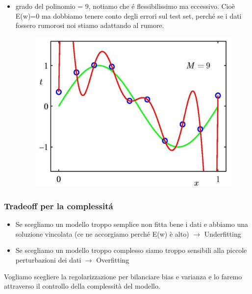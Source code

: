 \documentclass{article}
\begin{document}
\begin{itemize}
    \item grado del polinomio = 9, notiamo che é flessibilissimo ma eccessivo. Cioè E(w)=0 ma dobbiamo tenere conto degli errori sul test set, perché se i dati fossero rumorosi noi stiamo adattando al rumore.
    \begin{figure}[H]
    \centering
    \includegraphics[scale=0.3]{Images/9gradepol.png}
    \end{figure}
\end{itemize}

\subsubsection{Tradeoff per la complessitá}
\begin{itemize}
    \item Se scegliamo un modello troppo semplice non fitta bene i dati e abbiamo una soluzione vincolata (ce ne accorgiamo perché E(w) è alto) $\rightarrow$ Underfitting
    \item Se scegliamo un modello troppo complesso siamo troppo sensibili alla piccole perturbazioni dei dati $\rightarrow$ Overfitting
\end{itemize}
Vogliamo scegliere la regolarizzazione per bilanciare bias e varianza e lo faremo attraverso il controllo della complessità del modello.
\clearpage
\end{document}
